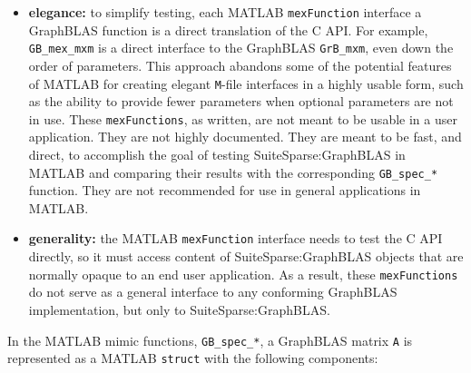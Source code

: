 \documentclass[12pt]{article}
\begin{document}
\begin{itemize}
\item {\bf elegance:}  to simplify testing, each MATLAB \verb'mexFunction'
    interface a GraphBLAS function is a direct translation of the C API.  For
    example, \verb'GB_mex_mxm' is a direct interface to the GraphBLAS
    \verb'GrB_mxm', even down the order of parameters.  This approach
    abandons some of the potential features of MATLAB for creating elegant
    \verb'M'-file interfaces in a highly usable form, such as the ability to
    provide fewer parameters when optional parameters are not in use.  These
    \verb'mexFunctions', as written, are not meant to be usable in a user
    application.  They are not highly documented.  They are meant to be fast,
    and direct, to accomplish the goal of testing SuiteSparse:GraphBLAS in
    MATLAB and comparing their results with the corresponding \verb'GB_spec_*'
    function.  They are not recommended for use in general applications in
    MATLAB.

\item {\bf generality:} the MATLAB \verb'mexFunction' interface needs to
    test the C API directly, so it must access content of SuiteSparse:GraphBLAS
    objects that are normally opaque to an end user application.  As a result,
    these \verb'mexFunctions' do not serve as a general interface to any
    conforming GraphBLAS implementation, but only to SuiteSparse:GraphBLAS.

\end{itemize}

In the MATLAB mimic functions, \verb'GB_spec_*', a GraphBLAS matrix \verb'A' is
represented as a MATLAB \verb'struct' with the following components:
\end{document}
